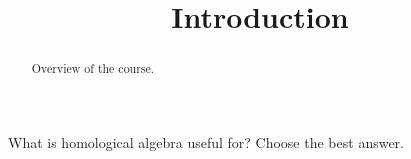 \documentclass{ximera}
\title{Introduction}
\begin{document}
\begin{abstract}
Overview of the course.
\end{abstract}
\maketitle



\begin{exercise}
  What is homological algebra useful for?
  Choose the best answer.
  \begin{multipleChoice}
  \end{multipleChoice}
\end{exercise}
\end{document}
